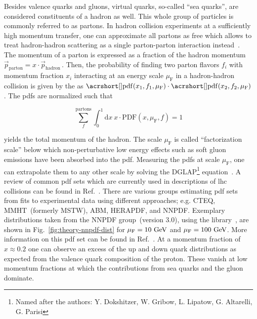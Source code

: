 Besides valence quarks and gluons, virtual quarks, so-called ``sea quarks'', are considered constituents of a hadron as well. This whole group of particles is commonly referred to as partons. In hadron collision experiments at a sufficiently high momentum transfer, one can approximate all partons as free which allows to treat hadron-hadron scattering as a single parton-parton interaction instead~\cite{Feynman:1969wa}. The momentum of a parton is expressed as a fraction of the hadron momentum $\vec{p}_\mathrm{parton}=x\cdot \vec{p}_\mathrm{hadron}\,$. Then, the probability of 
finding two parton flavors $f_{i}$ with momentum fraction $x_{i}$ interacting at an energy scale $\mu_\mathrm{F}$ in a hadron-hadron collision is given by the  as $\mathrm{\gls{pdf}}(x_{1},f_{1},\mu_\mathrm{F})\cdot\mathrm{\gls{pdf}}(x_{2},f_{2},\mu_\mathrm{F})\,$. The \glspl{pdf} are normalized such that

\begin{equation}
\sum_{f}^\mathrm{partons}\int_{0}^{1}\mathrm{d}x~x\cdot \mathrm{PDF}(x,\mu_\mathrm{F},f)=1
\end{equation}

yields the total momentum of the hadron. The scale $\mu_\mathrm{F}$ is called ``factorization scale'' below which non-perturbative low energy effects such as soft gluon emissions have been absorbed into the \gls{pdf}. Measuring the \glspl{pdf} at scale $\mu_\mathrm{F}$, one can extrapolate them to any other scale by solving the DGLAP\footnote{Named after the authors: Y. Dokshitzer, W. Gribow, L. Lipatow, G. Altarelli, G. Parisi} equation~\cite{Dokshitzer:1977sg,Gribov:1972ri,Altarelli:1977zs}. A review of common \gls{pdf} sets which are currently used in descriptions of \gls{lhc} collisions can be found in Ref.~\cite{Accardi2016}. There are various groups estimating \gls{pdf} sets from fits to experimental data using different approaches; e.g. CTEQ, MMHT~(formerly MSTW), ABM, HERAPDF, and NNPDF. Exemplary distributions taken from the NNPDF group~(version 3.0), using the \LHAPDF[format=hyperbf] library~\cite{Buckley:2014ana}, are shown in Fig.~\ref{fig:theory-nnpdf-dist} for $\mu_\mathrm{F}=10~\textrm{GeV}$ and $\mu_\mathrm{F}=100~\textrm{GeV}$. More information on this \gls{pdf} set can be found in Ref.~\cite{Ball:2014uwa}. At a momentum fraction of $x\approx0.2$ one can observe an excess of the up and down quark distributions as expected from the valence quark composition of the proton. These vanish at low momentum fractions at which the contributions from sea quarks and the gluon dominate.

